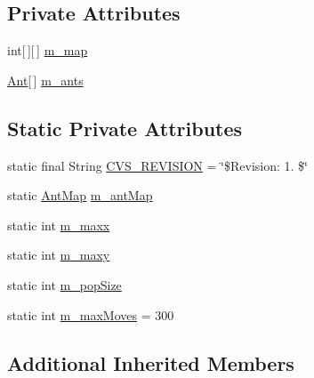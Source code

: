 \subsection*{Private Attributes}
\begin{DoxyCompactItemize}
\item 
int\mbox{[}$\,$\mbox{]}\mbox{[}$\,$\mbox{]} \hyperlink{classexamples_1_1gp_1_1painted_desert_1_1_painted_desert_problem_af606a24a87999ef920af629140d8dc54}{m\-\_\-map}
\item 
\hyperlink{classexamples_1_1gp_1_1painted_desert_1_1_ant}{Ant}\mbox{[}$\,$\mbox{]} \hyperlink{classexamples_1_1gp_1_1painted_desert_1_1_painted_desert_problem_afb38b967bddd8c6ec1adbad6701943a1}{m\-\_\-ants}
\end{DoxyCompactItemize}
\subsection*{Static Private Attributes}
\begin{DoxyCompactItemize}
\item 
static final String \hyperlink{classexamples_1_1gp_1_1painted_desert_1_1_painted_desert_problem_a8adf656b91e5eb446a29520bdddaa302}{C\-V\-S\-\_\-\-R\-E\-V\-I\-S\-I\-O\-N} = \char`\"{}\$Revision\-: 1. \$\char`\"{}
\item 
static \hyperlink{classexamples_1_1gp_1_1painted_desert_1_1_ant_map}{Ant\-Map} \hyperlink{classexamples_1_1gp_1_1painted_desert_1_1_painted_desert_problem_a84ab65c2498356537f9a1ac59d2f4ffb}{m\-\_\-ant\-Map}
\item 
static int \hyperlink{classexamples_1_1gp_1_1painted_desert_1_1_painted_desert_problem_a9fe6becef13c8c098487b2d9edc9be5f}{m\-\_\-maxx}
\item 
static int \hyperlink{classexamples_1_1gp_1_1painted_desert_1_1_painted_desert_problem_a6891744568f7f9fb1d7dc940f47d7b2d}{m\-\_\-maxy}
\item 
static int \hyperlink{classexamples_1_1gp_1_1painted_desert_1_1_painted_desert_problem_a28374d669de98b37ce5a82b2f1851cc5}{m\-\_\-pop\-Size}
\item 
static int \hyperlink{classexamples_1_1gp_1_1painted_desert_1_1_painted_desert_problem_a9324a92e69b6e83b4ceb0156eae7a68a}{m\-\_\-max\-Moves} = 300
\end{DoxyCompactItemize}
\subsection*{Additional Inherited Members}



